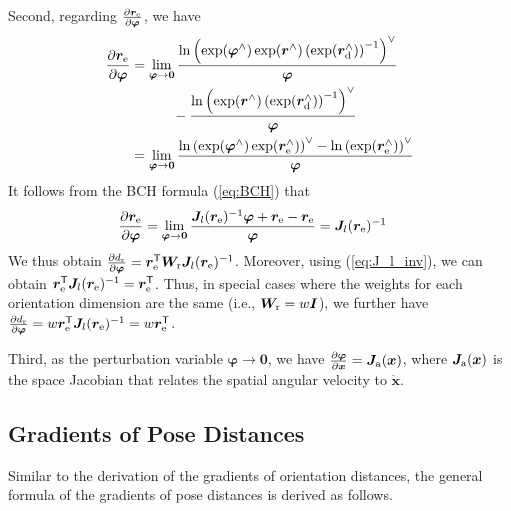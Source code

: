 {Second, regarding $\frac{\partial \bm r_{\rm e}}{\partial \bm \varphi}$, we have
\begin{equation} \label{eq:partial_re_partial_phi}
\begin{aligned}
    \frac{\partial \bm r_{\rm e}}{\partial \bm \varphi} 
    & = \lim_{\bm \varphi \rightarrow \bm 0}
    \frac{\ln \left( \exp(\bm \varphi^{\wedge}) \exp(\bm r^{\wedge}) \left(\exp (\bm r_{\rm d}^{\wedge}) \right)^{-1} \right)^{\vee}}
    { \bm \varphi}
    \\
    & \quad\quad\quad - \frac{\ln \left( \exp(\bm r^{\wedge}) \left(\exp (\bm r_{\rm d}^{\wedge}) \right)^{-1} \right)^{\vee}}
    { \bm \varphi}
    \\
    & =  \lim_{\bm \varphi \rightarrow \bm 0}
    \frac{ \ln \left( \exp(\bm \varphi^{\wedge}) \exp(\bm r_{\rm e}^{\wedge}) \right)^{\vee} - \ln \left( \exp(\bm r_{\rm e}^{\wedge}) \right)^{\vee} }
    {\bm \varphi}
\end{aligned}
\end{equation}
It follows from the BCH formula (\ref{eq:BCH}) that
\begin{equation} \label{eq:partial_re_partial_phi_2}
\begin{aligned}
    \frac{\partial \bm r_{\rm e}}{\partial \bm \varphi} 
    & =  \lim_{\bm \varphi \rightarrow \bm 0}
    \frac{ \bm J_l(\bm r_{\rm e})^{-1} \bm \varphi +  \bm r_{\rm e} - \bm r_{\rm e} }
    {\bm \varphi}
    = \bm J_l(\bm r_{\rm e})^{-1}
\end{aligned}
\end{equation}
We thus obtain 
$\frac{\partial d_{\rm r}}{\partial \bm \varphi} = \bm r_{\rm e}^{\mathsf{T}} \bm W_{\rm r} \bm J_l(\bm r_{\rm e})^{-1}$. 
Moreover, using (\ref{eq:J_l_inv}), we can obtain $\bm r_{\rm e}^{\mathsf{T}} \bm J_l(\bm r_{\rm e})^{-1} = \bm r_{\rm e}^{\mathsf{T}}$. 
Thus, in special cases where the weights for each orientation dimension are the same (i.e., $\bm W_{\rm r} = w \bm I$), we further have $\frac{\partial d_{\rm r}}{\partial \bm \varphi} = w  \bm r_{\rm e}^{\mathsf{T}} \bm J_l(\bm r_{\rm e})^{-1} = w  \bm r_{\rm e}^{\mathsf{T}}$.

Third, as the perturbation variable $\bm \varphi \rightarrow \bm 0$, we have $\frac{\partial \bm \varphi}{\partial \bm x} = \bm J_{\rm a}(\bm x)$,
where $\bm J_{\rm a}(\bm x)$ is the space Jacobian that relates the spatial angular velocity to $\dot{\bm x}$.

\subsection{Gradients of Pose Distances}
Similar to the derivation of the gradients of orientation distances, the general formula of the gradients of pose distances is derived as follows.

}

